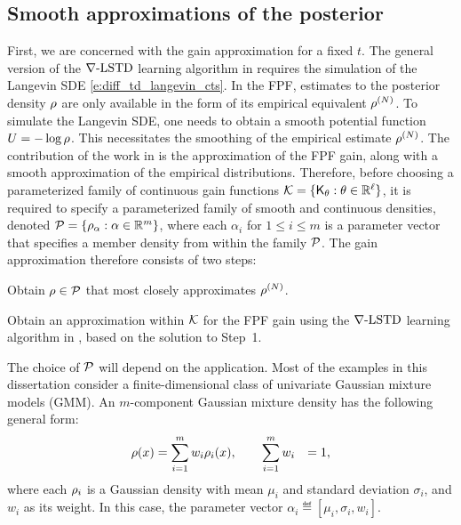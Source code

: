 \subsection{Smooth approximations of the posterior}
\label{s:fpf_em}
First, we are concerned with the gain approximation for a fixed $t$. The general version of the $\nabla\text{-LSTD}$ learning algorithm in  requires the simulation of the Langevin SDE \eqref{e:diff_td_langevin_cts}. In the FPF, estimates to the posterior density $\rho$ are only available in the form of its empirical equivalent $\rho^{(N)}$. To simulate the Langevin SDE, one needs to obtain a smooth potential function $U = -\log \rho$. This necessitates the smoothing of the empirical estimate $\rho^{(N)}$. The contribution of the work in \cite{raddevmey16} is the approximation of the FPF gain, along with a smooth approximation of the empirical distributions. Therefore, before choosing a parameterized family of continuous gain functions ${\cal K} = \{\text{\sf K}_\theta : \theta\in\mathbb{R}^{\ell}\}$, it is required to specify a parameterized family  of smooth and continuous densities, denoted  ${\cal P} = \{ \rho_\alpha : \alpha\in\mathbb{R}^m\}$, where each $\alpha_i$ for $1 \leq i \leq m$ is a parameter vector that specifies a member density from within the family ${\cal P}$.
The gain approximation therefore consists of two steps:
\begin{arabnum}
	\item Obtain $\rho\in{\cal P} $ that most closely approximates $\rho^{(N)}$.
	\item  Obtain an approximation within ${\cal K}$ for the FPF gain using the $\nabla\text{-LSTD}$ learning algorithm in , based on the solution to Step~1.
\end{arabnum}
The choice of ${\cal P}$ will depend on the application. Most of the examples in this dissertation consider a finite-dimensional class of univariate Gaussian mixture models (GMM). An $m$-component Gaussian mixture density has the following general form:
\begin{equation}
\begin{aligned}
\pr(x)& = \sum_{i=1}^{m} w_{i} \pr_{i}(x), \qquad  \sum_{i=1}^{m} w_{i} &=1 ,
\label{e:fpf_gaussian_mix}
\end{aligned}
\end{equation}
\noindent
where each $\rho_{i}$ is a Gaussian density with mean $\mu_{i}$ and standard deviation $\sigma_{i}$, and $w_i$ as its weight. In this case, the parameter vector $\alpha_i \eqdef [ \mu_i, \sigma_i, w_i]$. 
